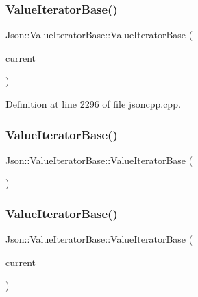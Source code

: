 \subsubsection{\texorpdfstring{Value\+Iterator\+Base()}{ValueIteratorBase()}\hspace{0.1cm}{\footnotesize\ttfamily [2/4]}}
{\footnotesize\ttfamily Json\+::\+Value\+Iterator\+Base\+::\+Value\+Iterator\+Base (\begin{DoxyParamCaption}\item[{const Value\+::\+Object\+Values\+::iterator \&}]{current }\end{DoxyParamCaption})\hspace{0.3cm}{\ttfamily [explicit]}}



Definition at line 2296 of file jsoncpp.\+cpp.

\hypertarget{class_json_1_1_value_iterator_base_af45b028d9ff9cbd2554a87878b42dd75}{}\label{class_json_1_1_value_iterator_base_af45b028d9ff9cbd2554a87878b42dd75} 
\subsubsection{\texorpdfstring{Value\+Iterator\+Base()}{ValueIteratorBase()}\hspace{0.1cm}{\footnotesize\ttfamily [3/4]}}
{\footnotesize\ttfamily Json\+::\+Value\+Iterator\+Base\+::\+Value\+Iterator\+Base (\begin{DoxyParamCaption}{ }\end{DoxyParamCaption})}

\hypertarget{class_json_1_1_value_iterator_base_a640e990e5f03a96fd650122a2906f59d}{}\label{class_json_1_1_value_iterator_base_a640e990e5f03a96fd650122a2906f59d} 
\subsubsection{\texorpdfstring{Value\+Iterator\+Base()}{ValueIteratorBase()}\hspace{0.1cm}{\footnotesize\ttfamily [4/4]}}
{\footnotesize\ttfamily Json\+::\+Value\+Iterator\+Base\+::\+Value\+Iterator\+Base (\begin{DoxyParamCaption}\item[{const Value\+::\+Object\+Values\+::iterator \&}]{current }\end{DoxyParamCaption})\hspace{0.3cm}{\ttfamily [explicit]}}



